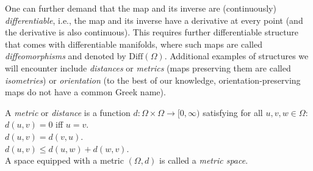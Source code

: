 %
%
One can further demand that the map and its inverse are (continuously) {\em  differentiable}, i.e., the map and its inverse have a derivative at every point (and the derivative is also continuous). 
%
This requires further differentiable structure that comes with differentiable manifolds, where such maps are called {\em diffeomorphisms} and denoted by $\mathrm{Diff}(\Omega)$. 
%
%
Additional examples of structures we will encounter include {\em distances} or {\em metrics} (maps preserving them are called {\em isometries}) or {\em orientation} (to the best of our knowledge, orientation-preserving maps do not have a common Greek name). 


\begin{tcolorbox}[width=\linewidth,
                  boxsep=0pt,
                  left=7.5pt,
                  right=7.5pt,
                  top=7.5pt,
                  bottom=7.5pt,
                  arc=0pt,
                  boxrule=0pt,toprule=0pt,
                  colback=boxgray,
                  ]%
A {\em metric} or {\em distance} is a function $d:\Omega\times\Omega \rightarrow [0,\infty)$ satisfying for all $u,v,w \in \Omega$:  \vspace{3mm}\\
     $d(u,v) =0$ iff $u=v$.\vspace{2mm}\\
     $d(u,v) = d(v,u)$.\vspace{2mm}\\
     $d(u,v) \leq  d(u,w) + d(w,v)$.\vspace{2mm}\\

A space equipped with a metric $(\Omega,d)$ is called a {\em metric space}. 

\end{tcolorbox}





